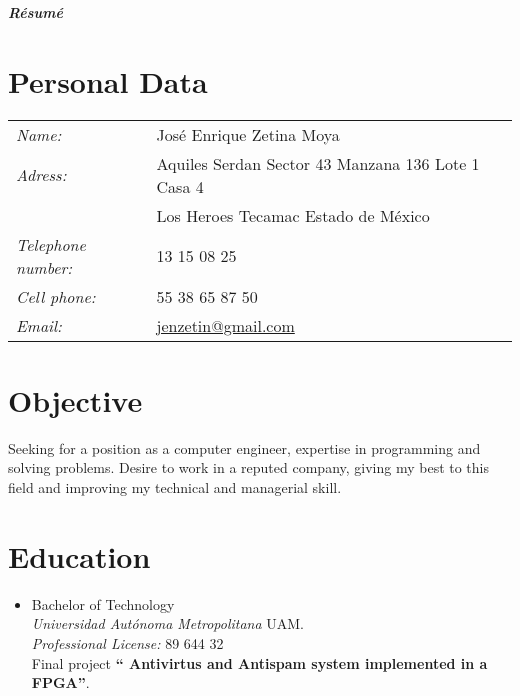 \documentclass[21pt, onecolumn]{article} %
\date{}
\begin{document}
\begin{center}
 \LARGE	 \textbf{\textit{Résumé}}\\
\end{center}


\section*{Personal Data}

\begin{tabular}{ l l }


\emph{Name:} 		&	José Enrique Zetina Moya\\
\emph{Adress:} 		&	Aquiles Serdan Sector 43 Manzana 136 Lote 1 Casa 4\\
				&Los Heroes  Tecamac Estado de México\\
\emph{Telephone number:} 	&	13 15 08 25\\
\emph{Cell phone:} &	55 38 65 87 50\\
\emph{Email:} &	\url{jenzetin@gmail.com}\\

 \end{tabular}

\section*{ Objective}

Seeking for a position as a computer engineer, expertise in programming and solving problems.
Desire to work in a reputed company, giving my best to this field and improving my technical 
and managerial skill.


\section*{ Education }

\begin{itemize}
 \item Bachelor of Technology\\
  \emph{Universidad Autónoma Metropolitana } UAM.\\
  \emph{Professional License:} 		89 644 32\\
Final project \textbf {`` Antivirtus and Antispam system implemented in
a FPGA''}.

\end{itemize}
\end{document}
